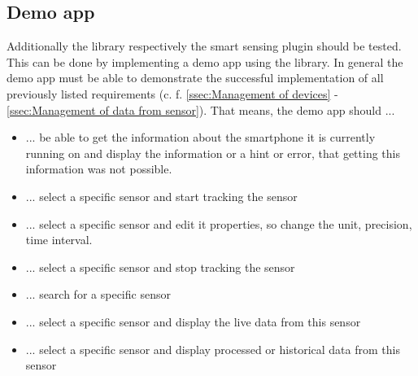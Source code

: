 \documentclass[12pt]{article}
\newcounter{fr}
\begin{document}
\subsection{Demo app}
Additionally the library respectively the smart sensing plugin should be tested. This can be done by implementing a demo app using the library. In general the demo app must be able to demonstrate the successful implementation of all previously listed requirements (c. f. \ref{ssec:Management of devices} - \ref{ssec:Management of data from sensor}). That means, the demo app should ... 
\begin{itemize}
    \item ... be able to get the information about the smartphone it is currently running on and display the information or a hint or error, that getting this information was not possible.
    \item ... select a specific sensor and start tracking the sensor
    \item ... select a specific sensor and edit it properties, so change the unit, precision, time interval.
    \item ... select a specific sensor and stop tracking the sensor
    \item ... search for a specific sensor
    \item ... select a specific sensor and display the live data from this sensor
    \item ... select a specific sensor and display processed or historical data from this sensor
\end{itemize}
\end{document}
